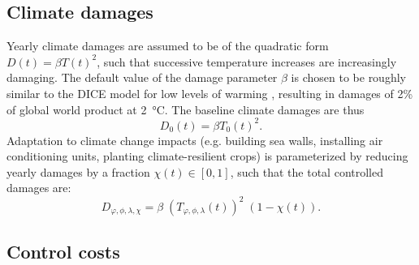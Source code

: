 \documentclass{article}
\begin{document}
\subsection{Climate damages}

Yearly climate damages are assumed to be of the quadratic form $D(t) = \beta T(t)^{2}$, such that successive temperature increases are increasingly damaging. The default value of the damage parameter $\beta$ is chosen to be roughly similar to the DICE model for low levels of warming \citep{Nordhaus}, resulting in damages of 2\% of global world product at \SI{2}{\celsius}. The baseline climate damages are thus
\begin{equation}
    D_{0}(t) = \beta T_{0}(t)^{2}.
\end{equation}
Adaptation to climate change impacts (e.g. building sea walls, installing air conditioning units, planting climate-resilient crops) is parameterized by reducing yearly damages by a fraction $\chi(t) \in [0,1]$, such that the total controlled damages are:
\begin{equation}
    D_{\varphi, \phi, \lambda, \chi} = \beta \; (T_{\varphi, \phi, \lambda}(t))^{2} \; (1-\chi(t)).
\end{equation}

\subsection{Control costs}
\end{document}
